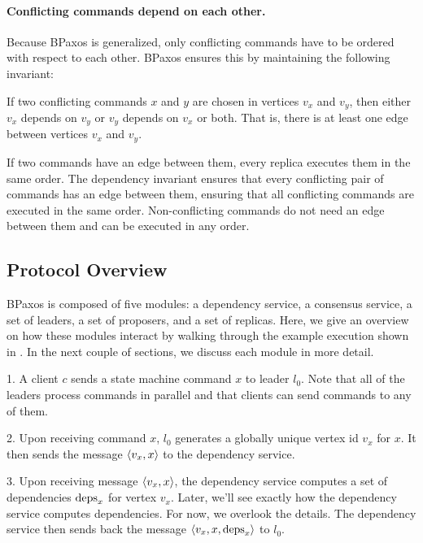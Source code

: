 {}

\paragraph{Conflicting commands depend on each other.}
Because BPaxos is generalized, only conflicting commands have to be ordered
with respect to each other. BPaxos ensures this by maintaining the following
invariant:
\begin{invariant}
  If two conflicting commands $x$ and $y$ are chosen in vertices $v_x$ and
  $v_y$, then either $v_x$ depends on $v_y$ or $v_y$ depends on $v_x$ or both.
  That is, there is at least one edge between vertices $v_x$ and $v_y$.
\end{invariant}
If two commands have an edge between them, every replica executes them in the
same order.  The dependency invariant ensures that every conflicting pair of
commands has an edge between them, ensuring that all conflicting commands are
executed in the same order. Non-conflicting commands do not need an edge
between them and can be executed in any order.

\subsection{Protocol Overview}
BPaxos is composed of five modules: a dependency service, a consensus service,
a set of leaders, a set of proposers, and a set of replicas. Here, we give an
overview on how these modules interact by walking through the example execution
shown in . In the next couple of sections, we discuss
each module in more detail.

1. A client $c$ sends a state machine command $x$ to leader $l_0$. Note that
all of the leaders process commands in parallel and that clients can send
commands to any of them.

2. Upon receiving command $x$, $l_0$ generates a globally unique vertex id
$v_x$ for $x$. It then sends the message $\langle v_x, x \rangle$ to the dependency
service.

3. Upon receiving message $\langle v_x, x \rangle$, the dependency service computes a set
of dependencies $\text{deps}_x$ for vertex $v_x$. Later, we'll see exactly how the
dependency service computes dependencies. For now, we overlook the details. The
dependency service then sends back the message $\langle v_x, x, \text{deps}_x \rangle$ to
$l_0$.

